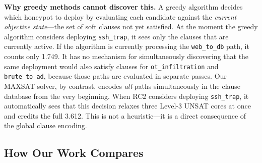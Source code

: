 \documentclass[journal]{IEEEtran}
\begin{document}
\begin{insightbox}
\textbf{Why greedy methods cannot discover this.}
A greedy algorithm decides which honeypot to deploy by
evaluating each candidate against the \emph{current
objective state}---the set of soft clauses not yet
satisfied.
At the moment the greedy algorithm considers deploying
\texttt{ssh\_trap}, it sees only the clauses that are
currently active.
If the algorithm is currently processing the
\texttt{web\_to\_db} path, it counts only 1.749.
It has no mechanism for simultaneously discovering that the
same deployment would also satisfy clauses for
\texttt{ot\_infiltration} and \texttt{brute\_to\_ad},
because those paths are evaluated in separate passes.
Our MAXSAT solver, by contrast, encodes \emph{all} paths
simultaneously in the clause database from the very
beginning.
When RC2 considers deploying \texttt{ssh\_trap}, it
automatically sees that this decision relaxes three
Level-3 UNSAT cores at once and credits the full 3.612.
This is not a heuristic---it is a direct consequence of the
global clause encoding.
\end{insightbox}

\subsection{How Our Work Compares}
\label{subsec:compare}
\end{document}

